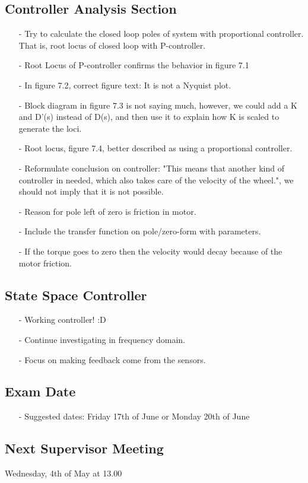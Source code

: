 \subsection{Controller Analysis Section}
\begin{itemize}
  \item[-] Try to calculate the closed loop poles of system with proportional controller. That is, root locus of closed loop with P-controller.
  \item[-] Root Locus of P-controller confirms the behavior in figure 7.1
  \item[-] In figure 7.2, correct figure text: It is not a Nyquist plot.
  \item[-] Block diagram in figure 7.3 is not saying much, however, we could add a K and D'(s) instead of D(s), and then use it to explain how K is scaled to generate the loci.
  \item[-] Root locus, figure 7.4, better described as using a proportional controller.
  \item[-] Reformulate conclusion on controller: "This means that another kind of controller in needed, which also takes care of the velocity of the wheel.", we should not imply that it is not possible.
  \item[-] Reason for pole left of zero is friction in motor.
  \item[-] Include the transfer function on pole/zero-form with parameters.
  \item[-] If the torque goes to zero then the velocity would decay because of the motor friction.
\end{itemize}

\subsection{State Space Controller}
\begin{itemize}
  \item[-] Working controller! :D
  \item[-] Continue investigating in frequency domain.
  \item[-] Focus on making feedback come from the sensors.
\end{itemize}

\subsection{Exam Date}
\begin{itemize}
  \item[-] Suggested dates: Friday 17th of June or Monday 20th of June
\end{itemize}

\subsection{Next Supervisor Meeting}
Wednesday, 4th of May at 13.00

